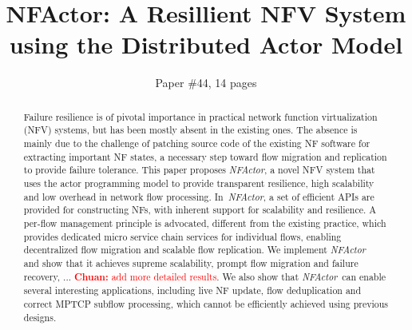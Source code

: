 \documentclass{sig-alternate-10pt}
\def\nfactor{\textit{NFActor}}
\newcommand{\chuan}[1]{\textcolor{red}{{\bf Chuan:} #1}}
\begin{document}
\title{\Large \bf NFActor: A Resillient NFV System using the Distributed Actor Model}


\author{
Paper \#44, 14 pages
}


\maketitle



\begin{abstract}

Failure resilience is of pivotal importance in practical network function virtualization (NFV) systems, but has been mostly absent in the existing ones.
The absence is mainly due to the challenge of patching source code of the existing NF software for extracting important NF states, a necessary step toward flow migration and replication to provide failure tolerance. %
 This paper proposes \nfactor, a novel NFV system that uses the actor programming model to provide transparent resilience, high scalability and low overhead in network flow processing. %
 In~\nfactor, a set of efficient APIs are provided for constructing NFs, with inherent support for scalability and resilience. A per-flow management principle is advocated, different from the existing practice, which provides dedicated micro service chain services for individual flows, enabling decentralized flow migration and scalable flow replication. %
We implement \nfactor~%
 and show that it achieves supreme scalability, prompt flow migration and failure recovery, ... \chuan{add more detailed results}.
We also show that \nfactor~can enable several interesting applications, including live NF update, flow deduplication and correct MPTCP subflow processing, which cannot be efficiently achieved using previous designs. %


\end{abstract}
\end{document}
